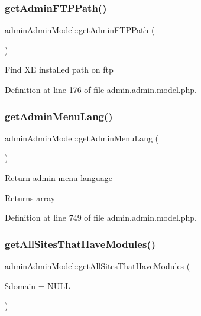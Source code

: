 \subsubsection{\texorpdfstring{get\+Admin\+F\+T\+P\+Path()}{getAdminFTPPath()}}
{\footnotesize\ttfamily admin\+Admin\+Model\+::get\+Admin\+F\+T\+P\+Path (\begin{DoxyParamCaption}{ }\end{DoxyParamCaption})}

Find XE installed path on ftp 

Definition at line 176 of file admin.\+admin.\+model.\+php.

\mbox{\label{classadminAdminModel_a6e21a5731925dc94cce1859dd96e7f25}} 
\subsubsection{\texorpdfstring{get\+Admin\+Menu\+Lang()}{getAdminMenuLang()}}
{\footnotesize\ttfamily admin\+Admin\+Model\+::get\+Admin\+Menu\+Lang (\begin{DoxyParamCaption}{ }\end{DoxyParamCaption})}

Return admin menu language \begin{DoxyReturn}{Returns}
array 
\end{DoxyReturn}


Definition at line 749 of file admin.\+admin.\+model.\+php.

\mbox{\label{classadminAdminModel_afca5a07a3f42ccc8c2f635557c668b44}} 
\subsubsection{\texorpdfstring{get\+All\+Sites\+That\+Have\+Modules()}{getAllSitesThatHaveModules()}}
{\footnotesize\ttfamily admin\+Admin\+Model\+::get\+All\+Sites\+That\+Have\+Modules (\begin{DoxyParamCaption}\item[{}]{\$domain = {\ttfamily NULL} }\end{DoxyParamCaption})}

